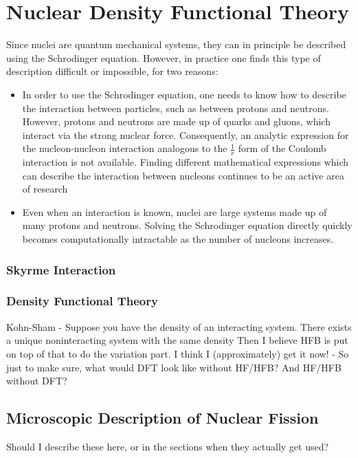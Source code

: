 \chapter{Nuclear Density Functional Theory}

\maketitle
Since nuclei are quantum mechanical systems, they can in principle be described using the Schrodinger equation. However, in practice one finds this type of description difficult or impossible, for two reasons:

\begin{itemize}
\item In order to use the Schrodinger equation, one needs to know how to describe the interaction between particles, such as between protons and neutrons. However, protons and neutrons are made up of quarks and gluons, which interact via the strong nuclear force. Consequently, an analytic expression for the nucleon-nucleon interaction analogous to the $\frac{1}{r}$ form of the Coulomb interaction is not available. Finding different mathematical expressions which can describe the interaction between nucleons continues to be an active area of research \cite{lots of papers}
\item Even when an interaction is known, nuclei are large systems made up of many protons and neutrons. Solving the Schrodinger equation directly quickly becomes computationally intractable as the number of nucleons increases.
\end{itemize}

\subsection{Skyrme Interaction}

\subsection{Density Functional Theory}
Kohn-Sham - Suppose you have the density of an interacting system. There exists a unique noninteracting system with the same density
Then I believe HFB is put on top of that to do the variation part. I think I (approximately) get it now! - So just to make sure, what would DFT look like without HF/HFB? And HF/HFB without DFT?

\section{Microscopic Description of Nuclear Fission}
Should I describe these here, or in the sections when they actually get used?

